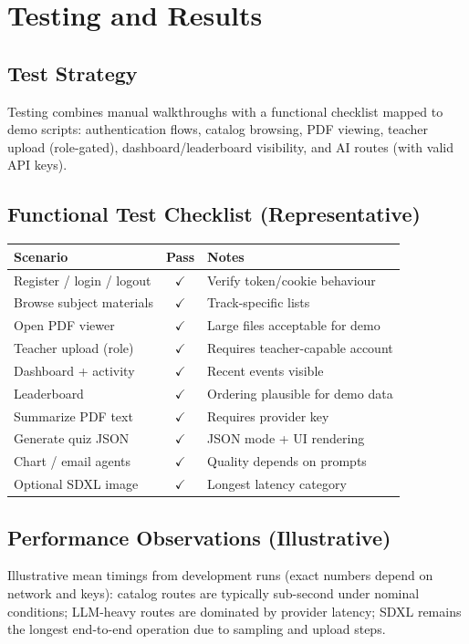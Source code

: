 \documentclass[a4paper,12pt,openany]{report}
\begin{document}
\chapter{Testing and Results}

\section{Test Strategy}
Testing combines manual walkthroughs with a functional checklist mapped to demo scripts: authentication flows, catalog browsing, PDF viewing, teacher upload (role-gated), dashboard/leaderboard visibility, and AI routes (with valid API keys).

\section{Functional Test Checklist (Representative)}
\begin{center}
\small
\begin{tabular}{@{}p{5.2cm}cp{6.5cm}@{}}
\toprule
\textbf{Scenario} & \textbf{Pass} & \textbf{Notes} \\
\midrule
Register / login / logout & $\checkmark$ & Verify token/cookie behaviour \\
Browse subject materials & $\checkmark$ & Track-specific lists \\
Open PDF viewer & $\checkmark$ & Large files acceptable for demo \\
Teacher upload (role) & $\checkmark$ & Requires teacher-capable account \\
Dashboard + activity & $\checkmark$ & Recent events visible \\
Leaderboard & $\checkmark$ & Ordering plausible for demo data \\
Summarize PDF text & $\checkmark$ & Requires provider key \\
Generate quiz JSON & $\checkmark$ & JSON mode + UI rendering \\
Chart / email agents & $\checkmark$ & Quality depends on prompts \\
Optional SDXL image & $\checkmark$ & Longest latency category \\
\bottomrule
\end{tabular}
\end{center}

\section{Performance Observations (Illustrative)}
Illustrative mean timings from development runs (exact numbers depend on network and keys): catalog routes are typically sub-second under nominal conditions; LLM-heavy routes are dominated by provider latency; SDXL remains the longest end-to-end operation due to sampling and upload steps.
\end{document}
